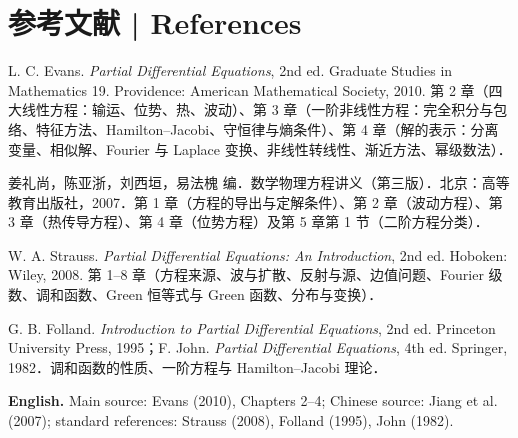 \documentclass[UTF8,11pt,a4paper]{ctexart}
\newcommand{\EN}[1]{\par\noindent \textbf{English.} #1\par}
\begin{document}
\section*{参考文献 | References}
{\small
\noindent L. C. Evans. \emph{Partial Differential Equations}, 2nd ed. Graduate Studies in Mathematics 19. Providence: American Mathematical Society, 2010. 第 2 章（四大线性方程：输运、位势、热、波动）、第 3 章（一阶非线性方程：完全积分与包络、特征方法、Hamilton--Jacobi、守恒律与熵条件）、第 4 章（解的表示：分离变量、相似解、Fourier 与 Laplace 变换、非线性转线性、渐近方法、幂级数法）．\par
\noindent 姜礼尚，陈亚浙，刘西垣，易法槐 编．数学物理方程讲义（第三版）．北京：高等教育出版社，2007．第 1 章（方程的导出与定解条件）、第 2 章（波动方程）、第 3 章（热传导方程）、第 4 章（位势方程）及第 5 章第 1 节（二阶方程分类）．\par
\noindent W. A. Strauss. \emph{Partial Differential Equations: An Introduction}, 2nd ed. Hoboken: Wiley, 2008. 第 1--8 章（方程来源、波与扩散、反射与源、边值问题、Fourier 级数、调和函数、Green 恒等式与 Green 函数、分布与变换）．\par
\noindent G. B. Folland. \emph{Introduction to Partial Differential Equations}, 2nd ed. Princeton University Press, 1995；F. John. \emph{Partial Differential Equations}, 4th ed. Springer, 1982．调和函数的性质、一阶方程与 Hamilton--Jacobi 理论．\par
\EN{Main source: Evans (2010), Chapters 2--4; Chinese source: Jiang et al. (2007); standard references: Strauss (2008), Folland (1995), John (1982).}
}
\end{document}

